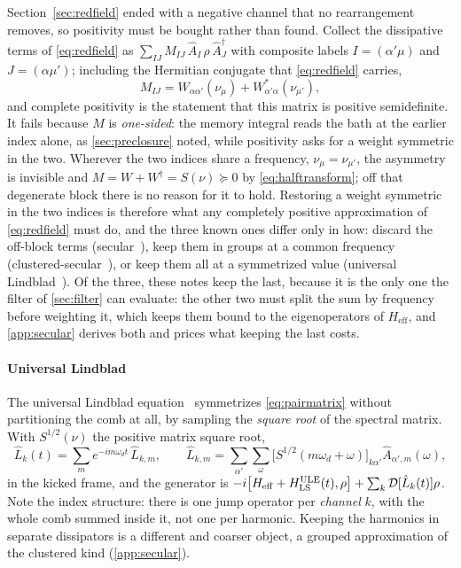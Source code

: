\documentclass[a4paper,11pt]{article}
\newcommand{\Dcal}{\mathcal{D}}
\newcommand{\eff}{\mathrm{eff}}
\begin{document}
Section~\ref{sec:redfield} ended with a negative channel that no rearrangement removes, so positivity must be bought rather than found. Collect the dissipative terms of \eqref{eq:redfield} as $\sum_{IJ}M_{IJ}\,\hat A_I\,\rho\,\hat A_J^\dagger$ with composite labels $I = (\alpha'\mu)$ and $J = (\alpha\mu')$; including the Hermitian conjugate that \eqref{eq:redfield} carries,
\begin{equation}\label{eq:pairmatrix}
  M_{IJ} = W_{\alpha\alpha'}(\nu_\mu) + W^*_{\alpha'\alpha}(\nu_{\mu'}),
\end{equation}
and complete positivity is the statement that this matrix is positive semidefinite. It fails because $M$ is \emph{one-sided}: the memory integral reads the bath at the earlier index alone, as \cref{sec:preclosure} noted, while positivity asks for a weight symmetric in the two. Wherever the two indices share a frequency, $\nu_\mu = \nu_{\mu'}$, the asymmetry is invisible and $M = W + W^\dagger = S(\nu)\succeq0$ by \eqref{eq:halftransform}; off that degenerate block there is no reason for it to hold. Restoring a weight symmetric in the two indices is therefore what any completely positive approximation of \eqref{eq:redfield} must do, and the three known ones differ only in how: discard the off-block terms (secular~\cite{Davies1974,Davies1976}), keep them in groups at a common frequency (clustered-secular~\cite{Farina2019Open,Trushechkin2021Unified}), or keep them all at a symmetrized value (universal Lindblad~\cite{Nathan2020Universal,Nathan2024Quantifying}). Of the three, these notes keep the last, because it is the only one the filter of \cref{sec:filter} can evaluate: the other two must split the sum by frequency before weighting it, which keeps them bound to the eigenoperators of $H_\eff$, and \cref{app:secular} derives both and prices what keeping the last costs.

\paragraph{Universal Lindblad}
The universal Lindblad equation~\cite{Nathan2020Universal} symmetrizes \eqref{eq:pairmatrix} without partitioning the comb at all, by sampling the \emph{square root} of the spectral matrix. With $S^{1/2}(\nu)$ the positive matrix square root,
\begin{equation}\label{eq:ule}
  \hat L_k(t) = \sum_m e^{-im\omega_d t}\,\hat L_{k,m},
  \qquad
  \hat L_{k,m} = \sum_{\alpha'}\sum_\omega \big[S^{1/2}(m\omega_d+\omega)\big]_{k\alpha'}\hat A_{\alpha',m}(\omega),
\end{equation}
in the kicked frame, and the generator is $-i\comm{H_\eff + H^{\mathrm{ULE}}_{\mathrm{LS}}(t)}{\rho} + \sum_k\Dcal[\hat L_k(t)]\rho$. Note the index structure: there is one jump operator per \emph{channel} $k$, with the whole comb summed inside it, not one per harmonic. Keeping the harmonics in separate dissipators is a different and coarser object, a grouped approximation of the clustered kind (\cref{app:secular}).
\end{document}

